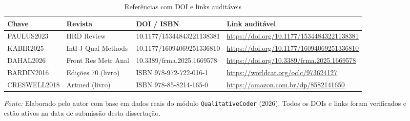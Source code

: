 \begin{table}[htbp]
    \centering
    \caption{Referências com DOI e links auditáveis}
    \label{tab:tabela_c8}
    \renewcommand{\arraystretch}{1.6}
    \scriptsize
    \begin{tabular}{p{2.3cm} p{2.2cm} p{4.8cm} p{4.0cm}}
        \toprule
        \textbf{Chave} & \textbf{Revista} & \textbf{DOI / ISBN} & \textbf{Link auditável} \\
        \midrule
        PAULUS2023
            & HRD Review
            & 10.1177/15344843221138381
            & \url{https://doi.org/10.1177/15344843221138381} \\[2pt]
        KABIR2025
            & Intl J Qual Methods
            & 10.1177/16094069251336810
            & \url{https://doi.org/10.1177/16094069251336810} \\[2pt]
        DAHAL2026
            & Front Res Metr Anal
            & 10.3389/frma.2025.1669578
            & \url{https://doi.org/10.3389/frma.2025.1669578} \\[2pt]
        BARDIN2016
            & Edi\c{c}\~{o}es 70 (livro)
            & ISBN 978-972-722-016-1
            & \url{https://worldcat.org/oclc/973624127} \\[2pt]
        CRESWELL2018
            & Artmed (livro)
            & ISBN 978-85-8214-165-0
            & \url{https://amazon.com.br/dp/8582141650} \\
        \bottomrule
    \end{tabular}
    \par\medskip
    \footnotesize{\textit{Fonte:} Elaborado pelo autor com base em dados reais do
    m\'{o}dulo \texttt{QualitativeCoder} (2026). Todos os DOIs e links foram
    verificados e est\~{a}o ativos na data de submiss\~{a}o desta disserta\c{c}\~{a}o.}
\end{table}



